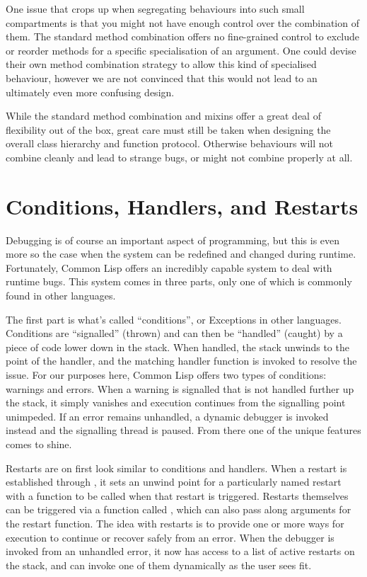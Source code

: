 \documentclass[a4paper]{paper}
\begin{document}
One issue that crops up when segregating behaviours into such small compartments is that you might not have enough control over the combination of them. The standard method combination offers no fine-grained control to exclude or reorder methods for a specific specialisation of an argument. One could devise their own method combination strategy to allow this kind of specialised behaviour, however we are not convinced that this would not lead to an ultimately even more confusing design.

While the standard method combination and mixins offer a great deal of flexibility out of the box, great care must still be taken when designing the overall class hierarchy and function protocol. Otherwise behaviours will not combine cleanly and lead to strange bugs, or might not combine properly at all.

\section{Conditions, Handlers, and Restarts}
Debugging is of course an important aspect of programming, but this is even more so the case when the system can be redefined and changed during runtime. Fortunately, Common Lisp offers an incredibly capable system to deal with runtime bugs. This system comes in three parts, only one of which is commonly found in other languages.

The first part is what's called ``conditions'', or Exceptions in other languages. Conditions are ``signalled'' (thrown) and can then be ``handled'' (caught) by a piece of code lower down in the stack. When handled, the stack unwinds to the point of the handler, and the matching handler function is invoked to resolve the issue. For our purposes here, Common Lisp offers two types of conditions: warnings and errors. When a warning is signalled that is not handled further up the stack, it simply vanishes and execution continues from the signalling point unimpeded. If an error remains unhandled, a dynamic debugger is invoked instead and the signalling thread is paused. From there one of the unique features comes to shine.

Restarts are on first look similar to conditions and handlers. When a restart is established through , it sets an unwind point for a particularly named restart with a function to be called when that restart is triggered. Restarts themselves can be triggered via a function called , which can also pass along arguments for the restart function. The idea with restarts is to provide one or more ways for execution to continue or recover safely from an error. When the debugger is invoked from an unhandled error, it now has access to a list of active restarts on the stack, and can invoke one of them dynamically as the user sees fit.
\end{document}
